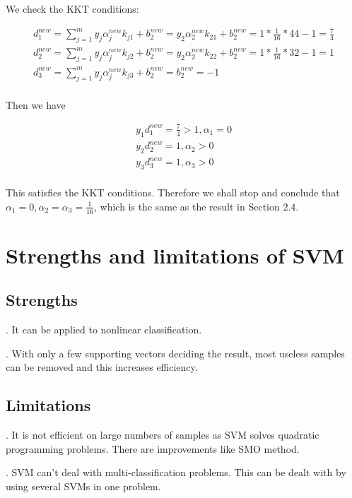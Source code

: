 \documentclass{article}
\begin{document}
We check the KKT conditions:

\begin{gather*}
d_1^{new}=\sum_{j=1}^m y_j \alpha_j^{new} k_{j 1} + b_2^{new} = y_2\alpha_2^{new}k_{21} + b_2^{new} = 1*\frac{1}{16}*44-1 = \frac{7}{4} \\
d_2^{new}=\sum_{j=1}^m y_j \alpha_j^{new} k_{j 2} + b_2^{new} = y_2\alpha_2^{new}k_{22} + b_2^{new} = 1*\frac{1}{16}*32-1 = 1 \\
d_3^{new}=\sum_{j=1}^m y_j \alpha_j^{new} k_{j 3} + b_2^{new} = b_2^{new} = -1 \\
\end{gather*}

Then we have

\begin{gather*}
y_1d_1^{new} = \frac{7}{4} > 1, \alpha_1 = 0\\
y_2d_2^{new} = 1, \alpha_2 > 0\\
y_3d_3^{new} = 1, \alpha_3 > 0\\
\end{gather*}

This satisfies the KKT conditions. Therefore we shall stop and conclude that $\alpha_1 = 0, \alpha_2 = \alpha_3 = \frac{1}{16}$, which is the same as the result in Section 2.4.

\section{Strengths and limitations of SVM}

\subsection{Strengths}

. It can be applied to nonlinear classification.

. With only a few supporting vectors deciding the result, most useless samples can be removed and this increases efficiency.

\subsection{Limitations}

. It is not efficient on large numbers of samples as SVM solves quadratic programming problems. There are improvements like SMO method.

. SVM can't deal with multi-classification problems. This can be dealt with by using several SVMs in one problem.
\end{document}
